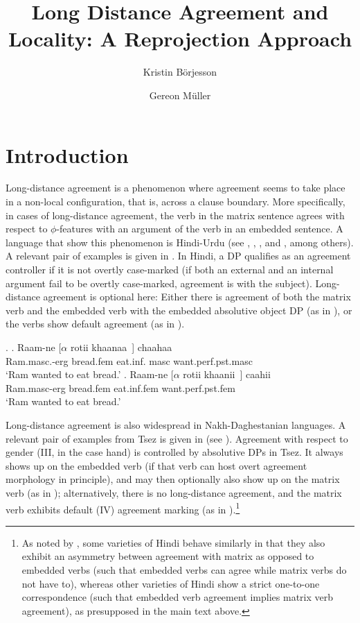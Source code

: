 \documentclass[output=paper
,modfonts
,nonflat]{langsci/langscibook}
\title{Long Distance Agreement and Locality: A Reprojection Approach}
\author{Kristin B\"orjesson\affiliation{Universit{\"a}t Leipzig}\and Gereon M\"uller\affiliation{Universit\"at Leipzig}}
\begin{document}
\maketitle


\section{Introduction}

Long-distance agreement is a phenomenon where agreement seems to take
place in a non-local configuration, that is, across a clause boundary.
More specifically, in cases of long-distance agreement, the verb in
the matrix sentence agrees with respect to $\phi$-features with an
argument of the verb in an embedded sentence. A language that show
this phenomenon is Hindi-Urdu (see \cite{Mahajan:90},
\cite{Butt:95,Butt:08}, \cite{Bhatt:05}, and \cite{Chandra:05}, among
others). A relevant pair of examples is given in \Next. In Hindi, a DP
qualifies as an agreement controller if it is not overtly case-marked (if
both an external and an internal argument fail to be overtly
case-marked, agreement is with the subject). Long-distance agreement
is optional here: Either there is agreement of both the matrix verb
and the embedded verb with the embedded absolutive object DP (as in
\Next[b]), or the verbs show default agreement (as in \Next[a]).

\Lsciexi.  \label{1}
 \ag.  Raam-ne [$\alpha$ rotii khaanaa~] chaahaa \\ 
      Ram.{\sc masc}.-{\sc erg} {} bread.{\sc fem} eat.{\sc inf}.{\sc
        masc} want.{\sc perf.pst.masc} \\ 
       `Ram wanted to eat bread.'
\bg.  Raam-ne [$\alpha$ rotii khaanii~] caahii \\ 
      Ram.{\sc masc}-{\sc erg} {} bread.{\sc fem} eat.{\sc inf}.{\sc fem} want.{\sc perf.pst.fem} \\ 
      `Ram wanted to eat bread.'

Long-distance agreement is also widespread in Nakh-Daghestanian
languages. A relevant pair of examples from Tsez is given in \Next
(see \cite{Polinsky&Potsdam:01}). Agreement with respect to gender
(III, in the case hand) is controlled by
absolutive DPs in Tsez. It always shows up on the embedded verb (if
that verb can host overt agreement morphology in principle), and may
then optionally also show up on the matrix verb (as in \Next[b]);
alternatively, there is no long-distance agreement, and the matrix
verb exhibits default (IV) agreement marking (as in \Next[a]).\footnote{As
  noted by \cite{Bhatt:05}, some varieties of Hindi behave similarly
  in that they also exhibit an asymmetry between agreement with matrix
  as opposed to embedded verbs (such that embedded verbs can agree
  while matrix verbs do not have to), whereas other varieties of Hindi show a
  strict one-to-one correspondence (such that embedded verb agreement
  implies matrix verb agreement), as presupposed in the main text above.}
\end{document}
